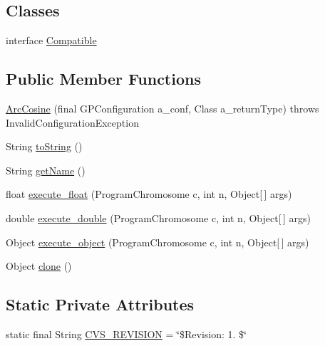 \subsection*{Classes}
\begin{DoxyCompactItemize}
\item 
interface \hyperlink{interfaceorg_1_1jgap_1_1gp_1_1function_1_1_arc_cosine_1_1_compatible}{Compatible}
\end{DoxyCompactItemize}
\subsection*{Public Member Functions}
\begin{DoxyCompactItemize}
\item 
\hyperlink{classorg_1_1jgap_1_1gp_1_1function_1_1_arc_cosine_ac4b71d4238e7b844f9c1ae083902144a}{Arc\-Cosine} (final G\-P\-Configuration a\-\_\-conf, Class a\-\_\-return\-Type)  throws Invalid\-Configuration\-Exception 
\item 
String \hyperlink{classorg_1_1jgap_1_1gp_1_1function_1_1_arc_cosine_aec56bf53a5f9f128167984336fb35426}{to\-String} ()
\item 
String \hyperlink{classorg_1_1jgap_1_1gp_1_1function_1_1_arc_cosine_a7aab1ccf509aeaa0b238be47959e67a2}{get\-Name} ()
\item 
float \hyperlink{classorg_1_1jgap_1_1gp_1_1function_1_1_arc_cosine_a50d4240ecc6c38dcda3e66d1ffb98a04}{execute\-\_\-float} (Program\-Chromosome c, int n, Object\mbox{[}$\,$\mbox{]} args)
\item 
double \hyperlink{classorg_1_1jgap_1_1gp_1_1function_1_1_arc_cosine_ac36483b95f08e8feb63864322db74dd2}{execute\-\_\-double} (Program\-Chromosome c, int n, Object\mbox{[}$\,$\mbox{]} args)
\item 
Object \hyperlink{classorg_1_1jgap_1_1gp_1_1function_1_1_arc_cosine_a1dbe3cd9e01c8f3b48f9b0f08ca1b62a}{execute\-\_\-object} (Program\-Chromosome c, int n, Object\mbox{[}$\,$\mbox{]} args)
\item 
Object \hyperlink{classorg_1_1jgap_1_1gp_1_1function_1_1_arc_cosine_a9c547cffc56dabddf82ae149843ec0e6}{clone} ()
\end{DoxyCompactItemize}
\subsection*{Static Private Attributes}
\begin{DoxyCompactItemize}
\item 
static final String \hyperlink{classorg_1_1jgap_1_1gp_1_1function_1_1_arc_cosine_a3e6e2df0c4398834132507ba26ea8303}{C\-V\-S\-\_\-\-R\-E\-V\-I\-S\-I\-O\-N} = \char`\"{}\$Revision\-: 1. \$\char`\"{}
\end{DoxyCompactItemize}
